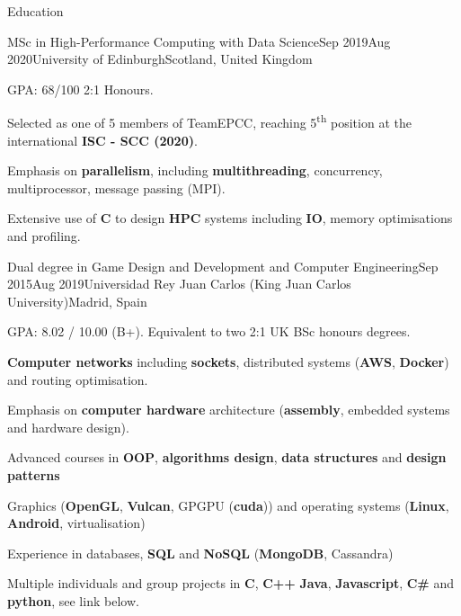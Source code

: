 \documentclass{resume} %
\begin{document}
\begin{mainSection}{Education}
\begin{educationItem}
{MSc in High-Performance Computing with Data Science}{Sep 2019}{Aug 2020}{University of Edinburgh}{Scotland, United Kingdom}

\item GPA: 68/100 2:1 Honours.

\item Selected as one of 5 members of TeamEPCC, reaching 5\textsuperscript{th} position at the international \textbf{ISC - SCC (2020)}.%

\item Emphasis on \textbf{parallelism}, including \textbf{multithreading}, concurrency, multiprocessor, message passing (MPI).

\item Extensive use of \textbf{C} to design \textbf{HPC} systems including \textbf{IO}, memory optimisations and profiling.
\end{educationItem}
\begin{educationItem}
{Dual degree in Game Design and Development and Computer Engineering}{Sep 2015}{Aug 2019}{Universidad Rey Juan Carlos (King Juan Carlos University)}{Madrid, Spain}

\item GPA: 8.02 / 10.00 (B+). Equivalent to two 2:1 UK BSc honours degrees.

\item \textbf{Computer networks} including \textbf{sockets}, distributed systems (\textbf{AWS}, \textbf{Docker}) and routing optimisation.

\item Emphasis on \textbf{computer hardware} architecture (\textbf{assembly}, embedded systems and hardware design).

\item Advanced courses in \textbf{OOP}, \textbf{algorithms design}, \textbf{data structures} and \textbf{design patterns}

\item Graphics (\textbf{OpenGL}, \textbf{Vulcan}, GPGPU (\textbf{cuda})) and operating systems (\textbf{Linux}, \textbf{Android}, virtualisation)

\item Experience in databases, \textbf{SQL} and \textbf{NoSQL} (\textbf{MongoDB}, Cassandra)

\item Multiple individuals and group projects in \textbf{C}, \textbf{C++} \textbf{Java}, \textbf{Javascript}, \textbf{C\#} and \textbf{python}, see link below.
\end{educationItem}
\end{mainSection}
\end{document}
